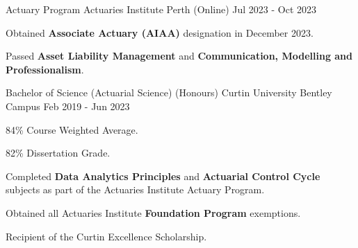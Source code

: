 

\begin{cventries}

  \cventry
    {Actuary Program} %
    {Actuaries Institute} %
    {Perth (Online)} %
    {Jul 2023 - Oct 2023} %
    {
      \begin{cvitems} %
        \item {Obtained \textbf{Associate Actuary (AIAA)} designation in December 2023.}
        \item {Passed \textbf{Asset Liability Management} and \textbf{Communication, Modelling and Professionalism}.}
      \end{cvitems}
    }

    \cventry
    {Bachelor of Science (Actuarial Science) (Honours)} %
    {Curtin University} %
    {Bentley Campus} %
    {Feb 2019 - Jun 2023} %
    {
      \begin{cvitems} %
        \item {84\% Course Weighted Average.}
        \item {82\% Dissertation Grade.}
        \item {Completed \textbf{Data Analytics Principles} and \textbf{Actuarial Control Cycle} subjects as part of the Actuaries Institute Actuary Program.}
        \item {Obtained all Actuaries Institute \textbf{Foundation Program} exemptions.}
        \item {Recipient of the Curtin Excellence Scholarship.}
      \end{cvitems}
    }

\end{cventries}
